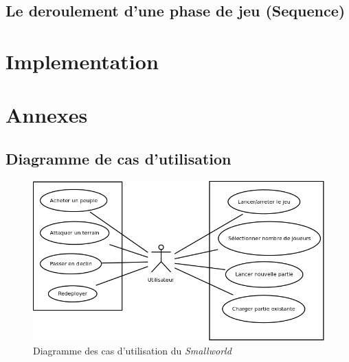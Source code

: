 \documentclass[a4paper]{report}
\begin{document}
\section{Le deroulement d'une phase de jeu (Sequence)}


\newpage
\chapter{Implementation}


\newpage
\chapter{Annexes}
\section{Diagramme de cas d'utilisation}
\begin{figure}
    \begin{center}
        \includegraphics[width=\textwidth]{use_case.png}
        \caption{Diagramme des cas d'utilisation du \textit{Smallworld}}
    \end{center}
\end{figure}
\end{document}
